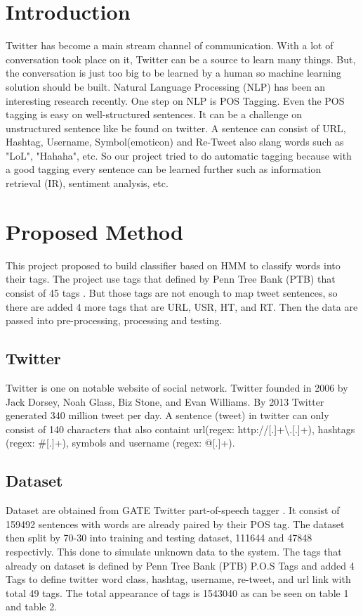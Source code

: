 \documentclass[conference,compsoc]{IEEEtran}
\begin{document}
\section{Introduction}
Twitter has become a main stream channel of communication. With a lot of conversation took place on it, Twitter can be a source to learn many things. But, the conversation is just too big to be learned by a human so machine learning solution should be built. Natural Language Processing (NLP) has been an interesting research recently\cite{POS:1,POS:2}. One step on NLP is POS Tagging. Even the POS tagging is easy on well-structured sentences. It can be a challenge on unstructured sentence like be found on twitter. A sentence can consist of URL, Hashtag, Username, Symbol(emoticon) and Re-Tweet also slang words such as "LoL", "Hahaha", etc. So our project tried to do automatic tagging because with a good tagging every sentence can be learned further such as information retrieval (IR), sentiment analysis, etc.

\section{Proposed Method}
This project proposed to build classifier based on HMM to classify words into their tags. The project use tags that defined by Penn Tree Bank (PTB) that consist of 45 tags \cite{POStag:PTB}. But those tags are not enough to map tweet sentences, so there are added 4 more tags that are URL, USR, HT, and RT. Then the data are passed into pre-processing, processing and testing.
\subsection{Twitter}
Twitter is one on notable website of social network. Twitter founded in 2006 by Jack Dorsey, Noah Glass, Biz Stone, and Evan Williams\cite{wiki:Twitter}. By 2013 Twitter generated 340 million tweet per day\cite{blog:Twitter}. A sentence (tweet) in twitter can only consist of 140 characters that also containt url(regex: http://[.]+\textbackslash .[.]+), hashtags (regex: \#[.]+), symbols and username (regex: @[.]+).
\subsection{Dataset}
Dataset are obtained from GATE Twitter part-of-speech tagger \cite{GateTAGE}. It consist of 159492 sentences with words are already paired by their POS tag. The dataset then split by 70-30 into training and testing dataset, 111644 and 47848 respectivly. This done to simulate unknown data to the system. The tags that already on dataset is defined by Penn Tree Bank (PTB) P.O.S Tags and added 4 Tags to define twitter word class, hashtag, username, re-tweet, and url link with total 49 tags. The total appearance of tags is 1543040 as can be seen on table 1 and table 2.
\end{document}
